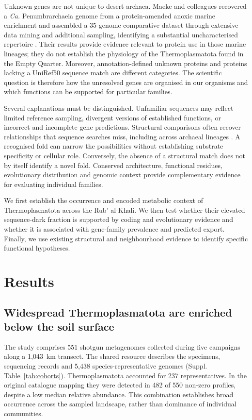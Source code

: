 \documentclass[11pt]{article}
\begin{document}
Unknown genes are not unique to desert archaea. Maeke and colleagues recovered a \emph{Ca.} Penumbrarchaeia genome from a protein-amended anoxic marine enrichment and assembled a 35-genome comparative dataset through extensive data mining and additional sampling, identifying a substantial uncharacterised repertoire \citep{maeke2025thermoplasmatota}. Their results provide evidence relevant to protein use in those marine lineages; they do not establish the physiology of the Thermoplasmatota found in the Empty Quarter. Moreover, annotation-defined unknown proteins and proteins lacking a UniRef50 sequence match are different categories. The scientific question is therefore how the unresolved genes are organised in our organisms and which functions can be supported for particular families.

Several explanations must be distinguished. Unfamiliar sequences may reflect limited reference sampling, divergent versions of established functions, or incorrect and incomplete gene predictions. Structural comparisons often recover relationships that sequence searches miss, including across archaeal lineages \citep{sussfeld2025divergent,schaeffer2026archaeal}. A recognised fold can narrow the possibilities without establishing substrate specificity or cellular role. Conversely, the absence of a structural match does not by itself identify a novel fold. Conserved architecture, functional residues, evolutionary distribution and genomic context provide complementary evidence for evaluating individual families.

We first establish the occurrence and encoded metabolic context of Thermoplasmatota across the Rub' al-Khali. We then test whether their elevated sequence-dark fraction is supported by coding and evolutionary evidence and whether it is associated with gene-family prevalence and predicted export. Finally, we use existing structural and neighbourhood evidence to identify specific functional hypotheses.

\section*{Results}

\subsection*{Widespread Thermoplasmatota are enriched below the soil surface}

The study comprises 551 shotgun metagenomes collected during five campaigns along a 1,043~km transect. The shared resource describes the specimens, sequencing records and 5,438 species-representative genomes \citep{rubalkhali_datapaper} (Suppl. Table~\ref{tab:cohorts}). Thermoplasmatota accounted for 237 representatives. In the original catalogue mapping they were detected in 482 of 550 non-zero profiles, despite a low median relative abundance. This combination establishes broad occurrence across the sampled landscape, rather than dominance of individual communities.
\end{document}
